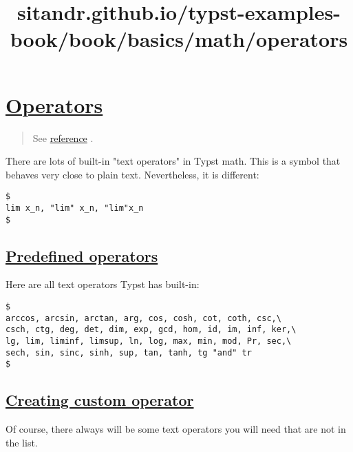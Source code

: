 \title{sitandr.github.io/typst-examples-book/book/basics/math/operators}

\section{\texorpdfstring{\hyperref[operators]{Operators}}{Operators}}\label{operators}

\begin{quote}
See \href{https://typst.app/docs/reference/math/op/}{reference} .
\end{quote}

There are lots of built-in "text operators" in Typst math. This is a
symbol that behaves very close to plain text. Nevertheless, it is
different:

\begin{verbatim}
$
lim x_n, "lim" x_n, "lim"x_n
$
\end{verbatim}

\pandocbounded{}

\subsection{\texorpdfstring{\hyperref[predefined-operators]{Predefined
operators}}{Predefined operators}}\label{predefined-operators}

Here are all text operators Typst has built-in:

\begin{verbatim}
$
arccos, arcsin, arctan, arg, cos, cosh, cot, coth, csc,\
csch, ctg, deg, det, dim, exp, gcd, hom, id, im, inf, ker,\
lg, lim, liminf, limsup, ln, log, max, min, mod, Pr, sec,\
sech, sin, sinc, sinh, sup, tan, tanh, tg "and" tr
$
\end{verbatim}

\pandocbounded{}

\subsection{\texorpdfstring{\hyperref[creating-custom-operator]{Creating
custom
operator}}{Creating custom operator}}\label{creating-custom-operator}

Of course, there always will be some text operators you will need that
are not in the list.

